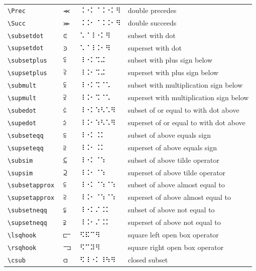 \documentclass[oneside]{article}
\begin{document}
\begin{longtable}{llll}
\verb|\Prec| & $\Prec$ &   ⠨⠐⠅⠈⠨⠐⠅⠻   & {double precedes} \\[2ex]
\verb|\Succ| & $\Succ$ &   ⠨⠨⠂⠈⠨⠨⠂⠻   & {double succeeds} \\[2ex]
\verb|\subsetdot| & $\subsetdot$ &   ⠡⠈⠸⠐⠅⠻   & {subset with dot} \\[2ex]
\verb|\supsetdot| & $\supsetdot$ &   ⠡⠈⠸⠨⠂⠻   & {superset with dot} \\[2ex]
\verb|\subsetplus| & $\subsetplus$ &   ⠸⠐⠅⠩⠬   & {subset with plus sign below} \\[2ex]
\verb|\supsetplus| & $\supsetplus$ &   ⠸⠨⠂⠩⠬   & {superset with plus sign below} \\[2ex]
\verb|\submult| & $\submult$ &   ⠸⠐⠅⠩⠈⠡   & {subset with multiplication sign below} \\[2ex]
\verb|\supmult| & $\supmult$ &   ⠸⠨⠂⠩⠈⠡   & {superset with multiplication sign below} \\[2ex]
\verb|\subedot| & $\subedot$ &   ⠸⠐⠅⠱⠣⠡⠻   & {subset of or equal to with dot above} \\[2ex]
\verb|\supedot| & $\supedot$ &   ⠸⠨⠂⠱⠣⠡⠻   & {superset of or equal to with dot above} \\[2ex]
\verb|\subseteqq| & $\subseteqq$ &   ⠸⠐⠅⠨⠅   & {subset of above equals sign} \\[2ex]
\verb|\supseteqq| & $\supseteqq$ &   ⠸⠨⠂⠨⠅   & {superset of above equals sign} \\[2ex]
\verb|\subsim| & $\subsim$ &   ⠸⠐⠅⠈⠱   & {subset of above tilde operator} \\[2ex]
\verb|\supsim| & $\supsim$ &   ⠸⠨⠂⠈⠱   & {superset of above tilde operator} \\[2ex]
\verb|\subsetapprox| & $\subsetapprox$ &   ⠸⠐⠅⠈⠱⠈⠱   & {subset of above almost equal to} \\[2ex]
\verb|\supsetapprox| & $\supsetapprox$ &   ⠸⠨⠂⠈⠱⠈⠱   & {superset of above almost equal to} \\[2ex]
\verb|\subsetneqq| & $\subsetneqq$ &   ⠸⠐⠅⠌⠨⠅   & {subset of above not equal to} \\[2ex]
\verb|\supsetneqq| & $\supsetneqq$ &   ⠸⠨⠂⠌⠨⠅   & {superset of above not equal to} \\[2ex]
\verb|\lsqhook| & $\lsqhook$ &   ⠫⠯⠉⠻   & {square left open box operator} \\[2ex]
\verb|\rsqhook| & $\rsqhook$ &   ⠫⠉⠽⠻   & {square right open box operator} \\[2ex]
\verb|\csub| & $\csub$ &   ⠫⠸⠐⠅⠸⠳⠻   & {closed subset} \\[2ex]

\end{longtable}
\end{document}
